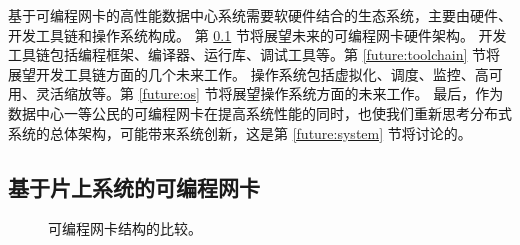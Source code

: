基于可编程网卡的高性能数据中心系统需要软硬件结合的生态系统，主要由硬件、开发工具链和操作系统构成。
第 \ref{future:progammable_nic} 节将展望未来的可编程网卡硬件架构。
开发工具链包括编程框架、编译器、运行库、调试工具等。第 \ref{future:toolchain} 节将展望开发工具链方面的几个未来工作。
操作系统包括虚拟化、调度、监控、高可用、灵活缩放等。第 \ref{future:os} 节将展望操作系统方面的未来工作。
最后，作为数据中心一等公民的可编程网卡在提高系统性能的同时，也使我们重新思考分布式系统的总体架构，可能带来系统创新，这是第 \ref{future:system} 节将讨论的。

\subsection{基于片上系统的可编程网卡}
\label{future:progammable_nic}


\begin{figure}[htbp]
	\centering
	\hspace{0.05\textwidth}
	\caption{可编程网卡结构的比较。}
\end{figure}

